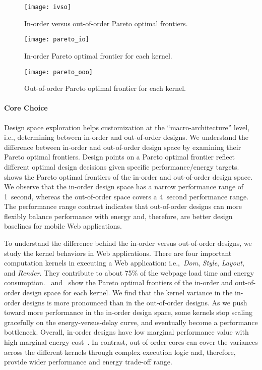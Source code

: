\begin{figure}[t]
\centering
  \begin{minipage}[b]{0.3\columnwidth}
  	\centering
  	\texttt{[image: ivso]}
  	\caption{In-order versus out-of-order Pareto optimal frontiers.}
  	\label{fig:ivso}
  \end{minipage}
  \hspace*{10pt}
  \begin{minipage}[b]{0.3\columnwidth}
  	\centering
  	\texttt{[image: pareto\_io]}
  	\caption{In-order Pareto optimal frontier for each kernel.}
  	\label{fig:pareto_io}
  \end{minipage}
  \hspace*{10pt}
  \begin{minipage}[b]{0.3\columnwidth}
  	\centering
  	\texttt{[image: pareto\_ooo]}
  	\caption{Out-of-order Pareto optimal frontier for each kernel.}
  	\label{fig:pareto_ooo}
  \end{minipage}
\end{figure}

\paragraph{Core Choice} Design space exploration helps customization at the ``macro-architecture'' level, i.e., determining between in-order and out-of-order designs. We understand the difference between in-order and out-of-order design space by examining their Pareto optimal frontiers. Design points on a Pareto optimal frontier reflect different optimal design decisions given specific performance/energy targets.  shows the Pareto optimal frontiers of the in-order and out-of-order design space. We observe that the in-order design space has a narrow performance range of 1~second, whereas the out-of-order space covers a 4~second performance range. The performance range contrast indicates that out-of-order designs can more flexibly balance performance with energy and, therefore, are better design baselines for mobile Web applications.

To understand the difference behind the in-order versus out-of-order designs, we study the kernel behaviors in Web applications. There are four important computation kernels in executing a Web application: i.e.,~\textit{Dom}, \textit{Style}, \textit{Layout}, and \textit{Render}. They contribute to about 75\% of the webpage load time and energy consumption.~ and~ show the Pareto optimal frontiers of the in-order and out-of-order design space for each kernel. We find that the kernel variance in the in-order designs is more pronounced than in the out-of-order designs. As we push toward more performance in the in-order design space, some kernels stop scaling gracefully on the energy-versus-delay curve, and eventually become a performance bottleneck. Overall, in-order designs have low marginal performance value with high marginal energy cost~\cite{marginal}. In contrast, out-of-order cores can cover the variances across the different kernels through complex execution logic and, therefore, provide wider performance and energy trade-off range.

